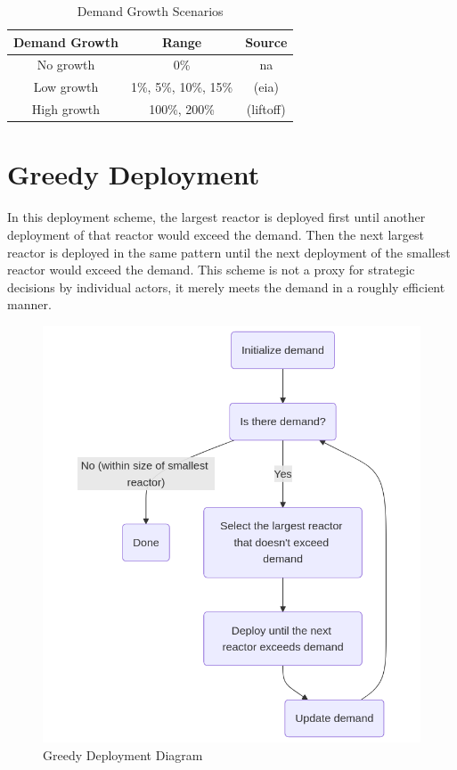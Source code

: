 \begin{table}[htbp]
    \centering
    \caption{Demand Growth Scenarios}
    \label{tab:demand_scenarios}
    \begin{tabular}{c c c}
        \hline
        \textbf{Demand Growth} & \textbf{Range} & \textbf{Source}\\
        \hline
        No growth & 0\% & na\\
        Low growth & 1\%, 5\%, 10\%, 15\% & (eia)\\
        High growth & 100\%, 200\% & (liftoff)\\
        \hline
    \end{tabular}
\end{table}

\section{Greedy Deployment}
In this deployment scheme, the largest reactor is deployed first until another
deployment of that reactor would exceed the demand. Then the next largest
reactor is deployed in the same pattern until the next deployment of the
smallest reactor would exceed the demand. This scheme is not a proxy for
strategic decisions by individual actors, it merely meets the demand in a
roughly efficient manner.

\begin{figure}[!htbp]
    \centering
    \includegraphics[scale=0.4]{images/schemes/greedy_diagram.png}
    \caption{Greedy Deployment Diagram}
    \label{fig:greedy_diagram}
\end{figure}

